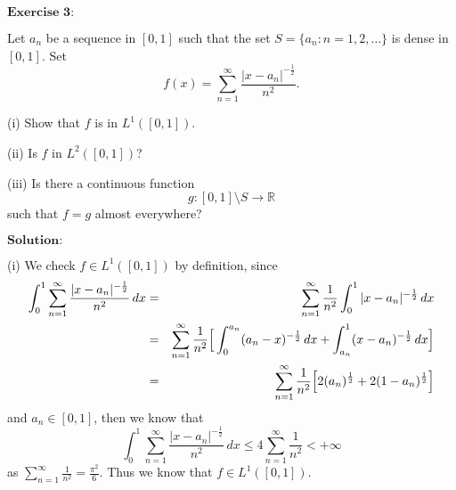\documentclass[12pt]{article}
\begin{document}
$\textbf{Exercise 3:}$

Let $a_{n}$ be a sequence in $[0, 1]$ such that the set $S = \{a_{n}: n = 1, 2, \dots \}$ is dense in $[0, 1]$. Set
\begin{equation*}
   f(x) = \sum_{n = 1}^{\infty} \frac{|x - a_{n}|^{- \frac{1}{2}}}{n^{2}}.
\end{equation*}

(i) Show that $f$ is in $L^{1}([0, 1])$.

(ii) Is $f$ in $L^{2} ([0, 1])$?

(iii) Is there a continuous function
\begin{equation*}
   g : [0, 1] \setminus S \rightarrow \mathbb{R}
\end{equation*}
such that $f = g$ almost everywhere?

\vspace{8pt}
$\textbf{Solution:}$

(i) We check $f \in L^{1}([0,1])$ by definition, since
\begin{eqnarray*}
\int_{0}^{1} \sum_{n = 1}^{\infty} \frac{|x - a_{n}|^{- \frac{1}{2}}}{n^{2}} \, d x  & = & \sum_{n = 1}^{\infty} \frac{1}{n^{2}} \int_{0}^{1} |x - a_{n}|^{- \frac{1}{2}} \, d x \\
& = & \sum_{n = 1}^{\infty} \frac{1}{n^{2}} \Big{[}  \int_{0}^{a_{n}} (a_{n} - x)^{- \frac{1}{2}} \, d x + \int_{a_{n}}^{1} (x - a_{n})^{- \frac{1}{2}} \, d x  \Big{]} \\
& = & \sum_{n = 1}^{\infty} \frac{1}{n^{2}} \Big{[} 2 (a_{n})^{\frac{1}{2}} + 2 (1 - a_{n})^{\frac{1}{2}}  \Big{]}
\end{eqnarray*}
and $a_{n} \in [0, 1]$, then we know that
\begin{equation*}
   \int_{0}^{1} \sum_{n = 1}^{\infty} \frac{|x - a_{n}|^{- \frac{1}{2}}}{n^{2}} \, d x \leq 4 \sum_{n = 1}^{\infty} \frac{1}{n^{2}} < + \infty
\end{equation*}
as $\sum_{n = 1}^{\infty} \frac{1}{n^{2}} = \frac{\pi^{2}}{6}$. Thus we know that $f \in L^{1}([0,1])$.
\end{document}

